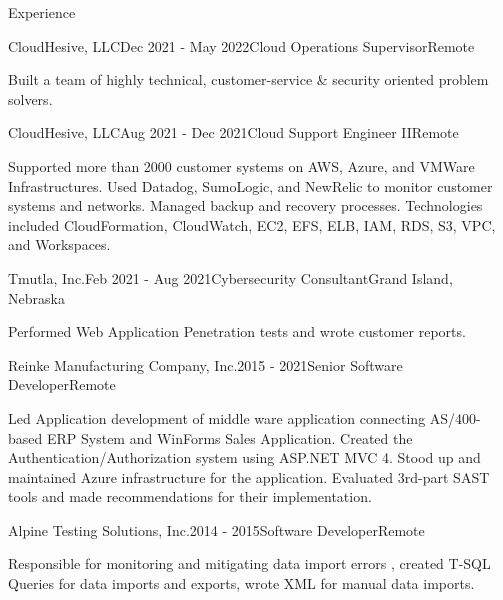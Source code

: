 \documentclass{resume} %
\begin{document}

\begin{rSection}{Experience}

\begin{rSubsection}{CloudHesive, LLC}{Dec 2021 - May 2022}{Cloud Operations Supervisor}{Remote}
\item Built a team of highly technical, customer-service \& security oriented problem solvers.  
\end{rSubsection}

\begin{rSubsection}{CloudHesive, LLC}{Aug 2021 - Dec 2021}{Cloud Support Engineer II}{Remote}
\item Supported more than 2000 customer systems on AWS, Azure, and VMWare Infrastructures. Used Datadog, SumoLogic, and NewRelic to monitor customer systems and networks. Managed backup and recovery processes. Technologies included CloudFormation, CloudWatch, EC2, EFS, ELB, IAM, RDS, S3, VPC, and Workspaces.  
\end{rSubsection}

\begin{rSubsection}{Tmutla, Inc.}{Feb 2021 - Aug 2021}{Cybersecurity Consultant}{Grand Island, Nebraska}
\item Performed Web Application Penetration tests and wrote customer reports.
\end{rSubsection}

\begin{rSubsection}{Reinke Manufacturing Company, Inc.}{2015 - 2021}{Senior Software Developer}{Remote} 
\item Led Application development of middle ware application connecting AS/400-based ERP System and WinForms Sales Application. Created the Authentication/Authorization system using ASP.NET MVC 4. Stood up and maintained Azure infrastructure for the application. Evaluated 3rd-part SAST tools and made recommendations for their implementation.
\end{rSubsection}

\begin{rSubsection}{Alpine Testing Solutions, Inc.}{2014 - 2015}{Software Developer}{Remote}
\item Responsible for monitoring and mitigating data import errors , created T-SQL Queries for data imports and exports, wrote XML for manual data imports.
\end{rSubsection}


\end{rSection}
\end{document}
